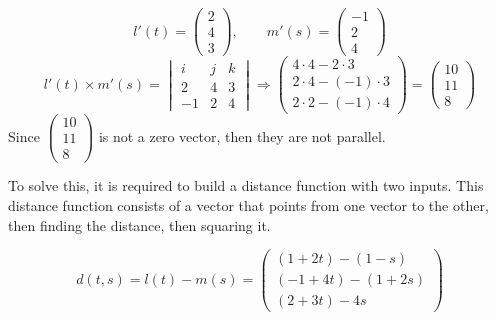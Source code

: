 \[
l'(t) = \begin{pmatrix}
    2\\ 4\\ 3
\end{pmatrix}, \qquad
m'(s) = \begin{pmatrix}
    -1\\2\\4
\end{pmatrix}
\]
\[
l'(t) \times m'(s) = 
\begin{vmatrix}
    i&j&k\\
    2&4&3\\
    -1&2&4
\end{vmatrix}
\Rightarrow
\begin{pmatrix}
    4\cdot4-2\cdot3\\
    2\cdot4-(-1)\cdot3\\
    2\cdot2-(-1)\cdot4
\end{pmatrix}
=
\begin{pmatrix}
    10\\
    11\\
    8
\end{pmatrix}
\]
Since $\begin{pmatrix} 10\\11\\8 \end{pmatrix}$ is
not a zero vector, then they are not parallel.

To solve this, it is required to build a distance function with two inputs.
This distance function consists of a vector that points from one vector to the other, 
then finding the distance, then squaring it.

\[d(t,s) = l(t) - m(s) = 
\begin{pmatrix}
    (1+2t) - (1-s)\\
    (-1+4t) - (1+2s)\\
    (2+3t)-4s
\end{pmatrix}\]

